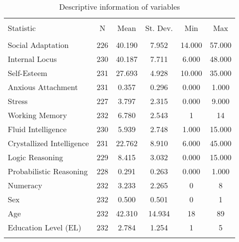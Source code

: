 
\begin{table}[!htbp] \centering 
  \caption{Descriptive information of variables} 
  \label{} 
\begin{tabular}{@{\extracolsep{5pt}}lccccc} 
\\[-1.8ex]\hline 
\hline \\[-1.8ex] 
Statistic & \multicolumn{1}{c}{N} & \multicolumn{1}{c}{Mean} & \multicolumn{1}{c}{St. Dev.} & \multicolumn{1}{c}{Min} & \multicolumn{1}{c}{Max} \\ 
\hline \\[-1.8ex] 
Social Adaptation & 226 & 40.190 & 7.952 & 14.000 & 57.000 \\ 
Internal Locus & 230 & 40.187 & 7.711 & 6.000 & 48.000 \\ 
Self-Esteem & 231 & 27.693 & 4.928 & 10.000 & 35.000 \\ 
Anxious Attachment & 231 & 0.357 & 0.296 & 0.000 & 1.000 \\ 
Stress & 227 & 3.797 & 2.315 & 0.000 & 9.000 \\ 
Working Memory & 232 & 6.780 & 2.543 & 1 & 14 \\ 
Fluid Intelligence & 230 & 5.939 & 2.748 & 1.000 & 15.000 \\ 
Crystallized Intelligence & 231 & 22.762 & 8.910 & 6.000 & 45.000 \\ 
Logic Reasoning & 229 & 8.415 & 3.032 & 0.000 & 15.000 \\ 
Probabilistic Reasoning & 228 & 0.291 & 0.263 & 0.000 & 1.000 \\ 
Numeracy & 232 & 3.233 & 2.265 & 0 & 8 \\ 
Sex & 232 & 0.500 & 0.501 & 0 & 1 \\ 
Age & 232 & 42.310 & 14.934 & 18 & 89 \\ 
Education Level (EL) & 232 & 2.784 & 1.254 & 1 & 5 \\ 
\hline \\[-1.8ex] 
\end{tabular} 
\end{table} 
